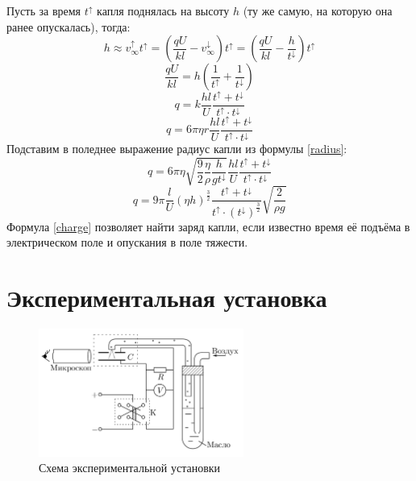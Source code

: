 \documentclass[14pt, a4paper,reqno]{article}
\begin{document}
    Пусть за время $t^{\uparrow}$ капля поднялась на высоту $h$ (ту же самую, на которую она ранее опускалась), тогда:
    \begin{equation*}
        h \approx v_{\infty}^{\uparrow} t^{\uparrow} = \left(\frac{qU}{kl} - v_{\infty}^{\downarrow}\right) t^{\uparrow} =
        \left(\frac{qU}{kl} - \frac{h}{t^{\downarrow}}\right) t^{\uparrow}
    \end{equation*}
    \begin{equation*}
        \frac{qU}{kl} = h\left(\frac{1}{t^{\uparrow}} + \frac{1}{t^{\downarrow}}\right)
    \end{equation*}
    \begin{equation*}
        q = k\frac{hl}{U}\frac{t^{\uparrow} + t^{\downarrow}}{t^{\uparrow} \cdot t^{\downarrow}}
    \end{equation*}
    \begin{equation*}
        q = 6\pi\eta r \frac{hl}{U}\frac{t^{\uparrow} + t^{\downarrow}}{t^{\uparrow} \cdot t^{\downarrow}}
    \end{equation*}
    Подставим в поледнее выражение радиус капли из формулы \eqref{radius}:
    \begin{equation*}
        q = 6\pi\eta \sqrt{\frac{9}{2}\frac{\eta}{\rho}\frac{h}{g t^{\downarrow}}} \frac{hl}{U}\frac{t^{\uparrow} + t^{\downarrow}}{t^{\uparrow} \cdot t^{\downarrow}}
    \end{equation*}
    \begin{equation}\label{charge}
        \boxed{q = 9\pi\frac{l}{U}(\eta h)^{\frac{3}{2}} \frac{t^{\uparrow} + t^{\downarrow}}{t^{\uparrow} \cdot (t^{\downarrow})^{\frac{3}{2}}} \sqrt{\frac{2}{\rho g}}}
    \end{equation}
    Формула \eqref{charge} позволяет найти заряд капли, если известно время её подъёма в электрическом поле и опускания в поле тяжести.

\section{Экспериментальная установка}

    \begin{figure}[h]
        \begin{center}
            \includegraphics[width = 0.6\textwidth]{images/picture_1.png}
        \end{center}
    \caption{Схема экспериментальной установки}
    \end{figure}
\end{document}
